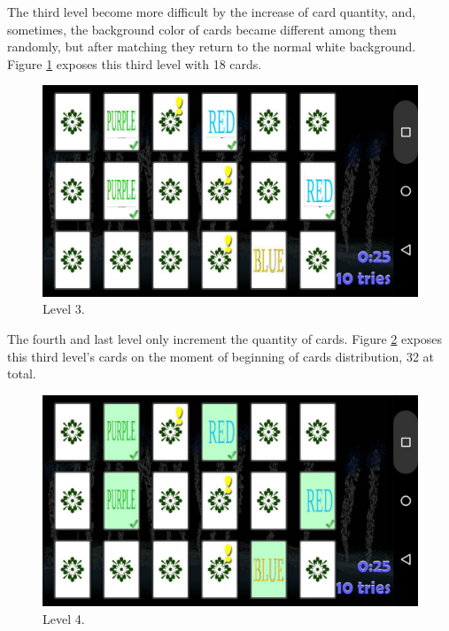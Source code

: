 The third level become more difficult by the increase of card quantity, and, sometimes, the background color of cards became different among them randomly, but after matching they return to the normal white background. Figure \ref{lv3} exposes this third level with 18 cards.


						\begin{figure}[htp]
							\begin{center}
								\includegraphics[scale=0.35]{chapters/desenvolvimento/img/memorystroop2.jpg}
								\caption{Level 3.}
								\label{lv3}
							\end{center}
						\end{figure}

The fourth and last level only increment the quantity of cards. Figure \ref{lv4} exposes this third level's cards on the moment of beginning of cards distribution, 32 at total.

						\begin{figure}[htp]
							\begin{center}
								\includegraphics[scale=0.25]{chapters/desenvolvimento/img/memorystroop4.jpg}
								\caption{Level 4.}
								\label{lv4}
							\end{center}
						\end{figure}


